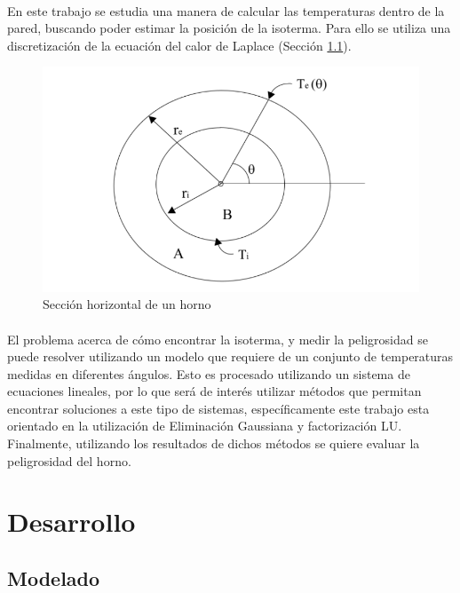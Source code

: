 \documentclass[12pt]{article}
\begin{document}
\paragraph{} En este trabajo se estudia una manera de calcular las temperaturas dentro de la pared, buscando poder estimar la posición de la isoterma. Para ello se utiliza una discretización de la ecuación del calor de Laplace (Sección \ref{sec:modelado}). 

\begin{figure}[H]
	\centering
	\includegraphics[scale=0.55]{alto_discreto}
	\caption{Sección horizontal de un horno}
	\label{fig:furnace}
\end{figure}

\paragraph{} El problema acerca de cómo encontrar la isoterma, y medir la peligrosidad se puede resolver utilizando un modelo que requiere de un conjunto de temperaturas medidas en diferentes ángulos. Esto es procesado utilizando un sistema de ecuaciones lineales, por lo que será de interés utilizar métodos que permitan encontrar soluciones a este tipo de sistemas, específicamente este trabajo esta orientado en la utilización de Eliminación Gaussiana y factorización LU. Finalmente, utilizando los resultados de dichos métodos se quiere evaluar la peligrosidad del horno.

\section{Desarrollo}

\subsection{Modelado}
\label{sec:modelado}
\end{document}
